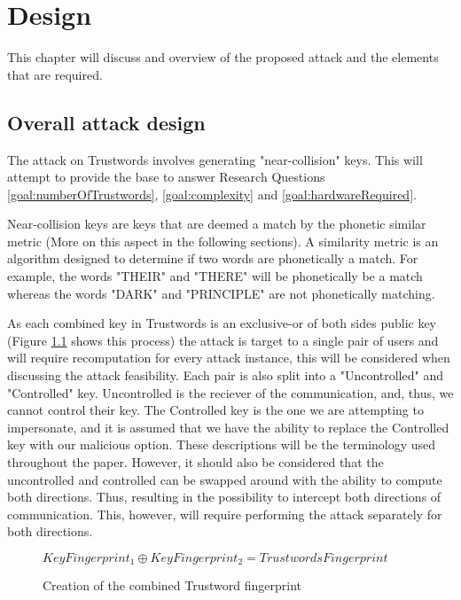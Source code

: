 \chapter{Design}
\label{cha:Design}

This chapter will discuss and overview of the proposed attack and the elements that are required.

\section{Overall attack design}

The attack on Trustwords involves generating "near-collision" keys. 
This will attempt to provide the base to answer Research Questions \ref{goal:numberOfTrustwords}, \ref{goal:complexity} and \ref{goal:hardwareRequired}.

Near-collision keys are keys that are deemed a match by the phonetic similar metric (More on this aspect in the following sections). A similarity metric is an algorithm designed to determine if two words are phonetically a match. For example, the words "THEIR" and "THERE" will be phonetically be a match whereas the words "DARK" and "PRINCIPLE" are not phonetically matching.

As each combined key in Trustwords is an exclusive-or of both sides public key (Figure \ref{fig:xor_trustwords} shows this process) the attack is target to a single pair of users and will require recomputation for every attack instance, this will be considered when discussing the attack feasibility. Each pair is also split into a "Uncontrolled" and "Controlled" key. Uncontrolled is the reciever of the communication, and, thus, we cannot control their key. The Controlled key is the one we are attempting to impersonate, and it is assumed that we have the ability to replace the Controlled key with our malicious option. These descriptions will be the terminology used throughout the paper. However, it should also be considered that the uncontrolled and controlled can be swapped around with the ability to compute both directions. Thus, resulting in the possibility to intercept both directions of communication. This, however, will require performing the attack separately for both directions.

\begin{figure}[h!]
    \centering
    $KeyFingerprint_{1} \oplus KeyFingerprint_{2} = TrustwordsFingerprint$
    \caption{Creation of the combined Trustword fingerprint}
    \label{fig:xor_trustwords}
\end{figure}

